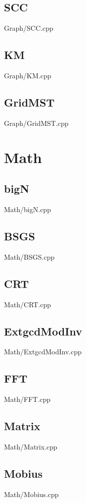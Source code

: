     \subsection{SCC}
         {Graph/SCC.cpp}
    \subsection{KM}
         {Graph/KM.cpp}
    \subsection{GridMST}
         {Graph/GridMST.cpp}

\section{Math}
    \subsection{bigN}
         {Math/bigN.cpp}
    \subsection{BSGS}
         {Math/BSGS.cpp}
    \subsection{CRT}
         {Math/CRT.cpp}
    \subsection{ExtgcdModInv}
         {Math/ExtgcdModInv.cpp}
    \subsection{FFT}
         {Math/FFT.cpp}
    \subsection{Matrix}
         {Math/Matrix.cpp}
    \subsection{Mobius}
         {Math/Mobius.cpp}
